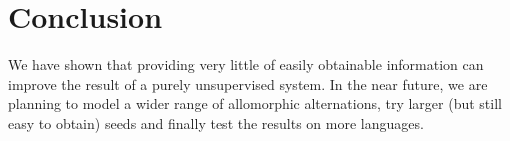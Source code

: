 \documentclass{itatnew}
\begin{document}
\section{Conclusion}

We have shown that providing very little of easily obtainable information can improve the result of a purely unsupervised system. In the near future, we are planning to model a wider range of allomorphic alternations, try larger (but still easy to obtain) seeds and finally test the results on more languages.

%
%

{}
\end{document}
